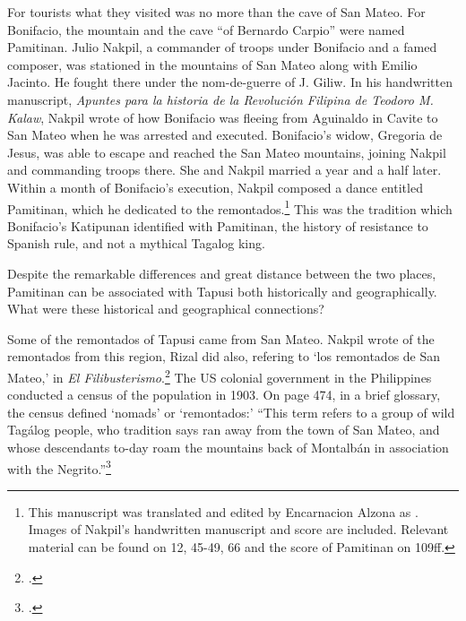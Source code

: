 For tourists what they visited was no more than the cave of San Mateo. For Bonifacio, the mountain and the cave \enquote{of Bernardo Carpio} were named Pamitinan. Julio Nakpil, a commander of troops under Bonifacio and a famed composer, was stationed in the mountains of San Mateo along with Emilio Jacinto. He fought there under the nom-de-guerre of J. Giliw. In his handwritten manuscript, \textit{Apuntes para la historia de la Revoluci\'on Filipina de Teodoro M. Kalaw}, Nakpil wrote of how Bonifacio was fleeing from Aguinaldo in Cavite to San Mateo when he was arrested and executed. Bonifacio's widow, Gregoria de Jesus, was able to escape and reached the San Mateo mountains, joining Nakpil and commanding troops there. She and Nakpil married a year and a half later. Within a month of Bonifacio’s execution, Nakpil composed a dance entitled Pamitinan, which he dedicated to the remontados.\footnote{This manuscript was translated and edited by Encarnacion Alzona as \cite{Alzona1964}. Images of Nakpil's handwritten manuscript and score are included. Relevant material can be found on 12, 45-49, 66 and the score of Pamitinan on 109ff.} This was the tradition which Bonifacio’s Katipunan identified with Pamitinan, the history of resistance to Spanish rule, and not a mythical Tagalog king.

Despite the remarkable differences and great distance between the two places, Pamitinan can be associated with Tapusi both historically and geographically. What were these historical and geographical connections?

Some of the remontados of Tapusi came from San Mateo. Nakpil wrote of the remontados from this region, Rizal did also, refering to \enquote*{los remontados de San Mateo,} in \textit{El Filibusterismo}.\footcite[217]{Rizal1996} The US colonial government in the Philippines conducted a census of the population in 1903. On page 474, in a brief glossary, the census defined \enquote*{nomads} or \enquote*{remontados:}  \enquote{This term refers to a group of wild Tag\'alog people, who tradition says ran away from the town of San Mateo, and whose descendants to-day roam the mountains back of Montalb\'an in association with the Negrito.}\footcite[474]{Census1905}

